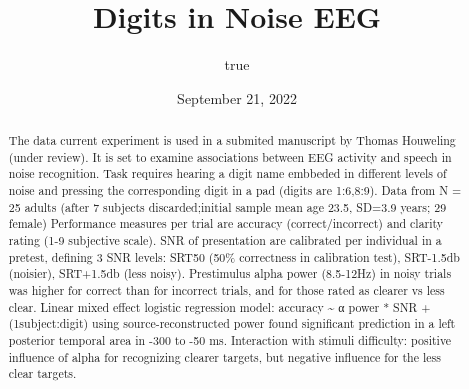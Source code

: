 \documentclass[
]{article}
\title{Digits in Noise EEG}
\author{true}
\date{September 21, 2022}
\begin{document}
\maketitle
\begin{abstract}
The data current experiment is used in a submited manuscript by Thomas
Houweling (under review). It is set to examine associations between EEG
activity and speech in noise recognition. Task requires hearing a digit
name embbeded in different levels of noise and pressing the
corresponding digit in a pad (digits are 1:6,8:9). Data from N = 25
adults (after 7 subjects discarded;initial sample mean age 23.5, SD=3.9
years; 29 female) Performance measures per trial are accuracy
(correct/incorrect) and clarity rating (1-9 subjective scale). SNR of
presentation are calibrated per individual in a pretest, defining 3 SNR
levels: SRT50 (50\% correctness in calibration test), SRT-1.5db
(noisier), SRT+1.5db (less noisy). Prestimulus alpha power (8.5-12Hz) in
noisy trials was higher for correct than for incorrect trials, and for
those rated as clearer vs less clear. Linear mixed effect logistic
regression model: accuracy \textasciitilde{} α power * SNR +
(1\textbar subject:digit) using source-reconstructed power found
significant prediction in a left posterior temporal area in -300 to -50
ms. Interaction with stimuli difficulty: positive influence of alpha for
recognizing clearer targets, but negative influence for the less clear
targets.
\end{abstract}
\end{document}
